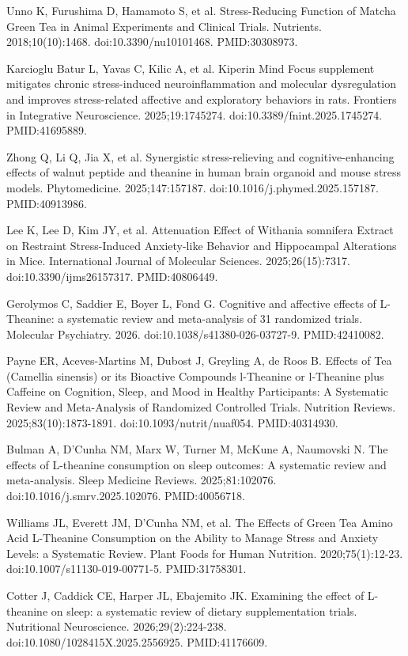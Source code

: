 \documentclass[12pt,oneside]{book}
\newcommand{\reff}[2]{\par\hangindent=7mm\hangafter=1\noindent[#1]\hspace{2mm}#2\par}
\begin{document}
\reff{28}{Unno K, Furushima D, Hamamoto S, et al. Stress-Reducing Function of Matcha Green Tea in Animal Experiments and Clinical Trials. Nutrients. 2018;10(10):1468. doi:10.3390/nu10101468. PMID:30308973.}

\reff{29}{Karcioglu Batur L, Yavas C, Kilic A, et al. Kiperin Mind Focus supplement mitigates chronic stress-induced neuroinflammation and molecular dysregulation and improves stress-related affective and exploratory behaviors in rats. Frontiers in Integrative Neuroscience. 2025;19:1745274. doi:10.3389/fnint.2025.1745274. PMID:41695889.}

\reff{30}{Zhong Q, Li Q, Jia X, et al. Synergistic stress-relieving and cognitive-enhancing effects of walnut peptide and theanine in human brain organoid and mouse stress models. Phytomedicine. 2025;147:157187. doi:10.1016/j.phymed.2025.157187. PMID:40913986.}

\reff{31}{Lee K, Lee D, Kim JY, et al. Attenuation Effect of Withania somnifera Extract on Restraint Stress-Induced Anxiety-like Behavior and Hippocampal Alterations in Mice. International Journal of Molecular Sciences. 2025;26(15):7317. doi:10.3390/ijms26157317. PMID:40806449.}

\reff{32}{Gerolymos C, Saddier E, Boyer L, Fond G. Cognitive and affective effects of L-Theanine: a systematic review and meta-analysis of 31 randomized trials. Molecular Psychiatry. 2026. doi:10.1038/s41380-026-03727-9. PMID:42410082.}

\reff{33}{Payne ER, Aceves-Martins M, Dubost J, Greyling A, de Roos B. Effects of Tea (Camellia sinensis) or its Bioactive Compounds l-Theanine or l-Theanine plus Caffeine on Cognition, Sleep, and Mood in Healthy Participants: A Systematic Review and Meta-Analysis of Randomized Controlled Trials. Nutrition Reviews. 2025;83(10):1873-1891. doi:10.1093/nutrit/nuaf054. PMID:40314930.}

\reff{34}{Bulman A, D'Cunha NM, Marx W, Turner M, McKune A, Naumovski N. The effects of L-theanine consumption on sleep outcomes: A systematic review and meta-analysis. Sleep Medicine Reviews. 2025;81:102076. doi:10.1016/j.smrv.2025.102076. PMID:40056718.}

\reff{35}{Williams JL, Everett JM, D'Cunha NM, et al. The Effects of Green Tea Amino Acid L-Theanine Consumption on the Ability to Manage Stress and Anxiety Levels: a Systematic Review. Plant Foods for Human Nutrition. 2020;75(1):12-23. doi:10.1007/s11130-019-00771-5. PMID:31758301.}

\reff{36}{Cotter J, Caddick CE, Harper JL, Ebajemito JK. Examining the effect of L-theanine on sleep: a systematic review of dietary supplementation trials. Nutritional Neuroscience. 2026;29(2):224-238. doi:10.1080/1028415X.2025.2556925. PMID:41176609.}
\end{document}
